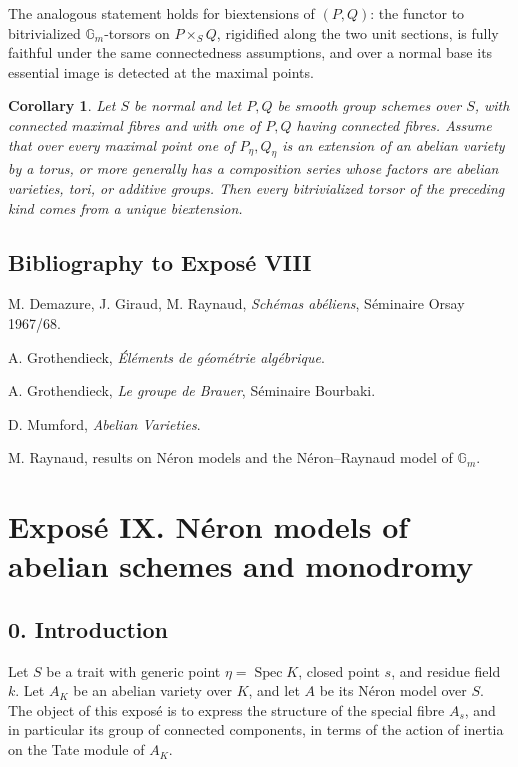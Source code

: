 \documentclass[11pt]{article}
\newtheorem{corollary}[proposition]{Corollary}
\newcommand{\Gm}{\mathbb G_m}
\newcommand{\Spec}{\operatorname{Spec}}
\begin{document}
The analogous statement holds for biextensions of \((P,Q)\): the functor to
bitrivialized \(\Gm\)-torsors on \(P\times_S Q\), rigidified along the two unit
sections, is fully faithful under the same connectedness assumptions, and over a
normal base its essential image is detected at the maximal points.

\begin{corollary}
Let \(S\) be normal and let \(P,Q\) be smooth group schemes over \(S\), with
connected maximal fibres and with one of \(P,Q\) having connected fibres. Assume
that over every maximal point one of \(P_\eta,Q_\eta\) is an extension of an
abelian variety by a torus, or more generally has a composition series whose
factors are abelian varieties, tori, or additive groups. Then every bitrivialized
torsor of the preceding kind comes from a unique biextension.
\end{corollary}

\subsection*{Bibliography to Exposé VIII}

\begin{enumerate}[label={[\arabic*]}]
\item M. Demazure, J. Giraud, M. Raynaud, \emph{Schémas abéliens}, Séminaire
Orsay 1967/68.
\item A. Grothendieck, \emph{Éléments de géométrie algébrique}.
\item A. Grothendieck, \emph{Le groupe de Brauer}, Séminaire Bourbaki.
\item D. Mumford, \emph{Abelian Varieties}.
\item M. Raynaud, results on Néron models and the Néron--Raynaud model of
\(\Gm\).
\end{enumerate}



\clearpage
\section*{Exposé IX. Néron models of abelian schemes and monodromy}

\subsection*{0. Introduction}

Let \(S\) be a trait with generic point \(\eta=\Spec K\), closed point \(s\),
and residue field \(k\). Let \(A_K\) be an abelian variety over \(K\), and let
\(A\) be its Néron model over \(S\). The object of this exposé is to express the
structure of the special fibre \(A_s\), and in particular its group of connected
components, in terms of the action of inertia on the Tate module of \(A_K\).
\end{document}
